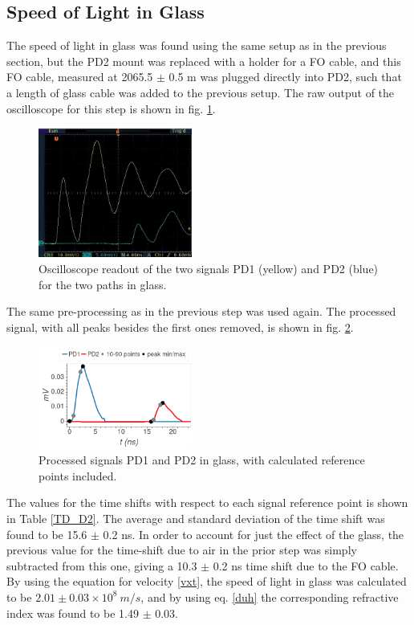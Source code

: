 \documentclass[aps,prl,reprint]{revtex4-2}
\begin{document}
\subsection{Speed of Light in Glass}

The speed of light in glass was found using the same setup as in the previous section,
but the PD2 mount was replaced with a holder for a FO cable, and this FO cable, measured
at 2065.5 $\pm$ 0.5 m was plugged directly into PD2, such that a length of glass cable
was added to the previous setup. The raw output of the oscilloscope for this step is shown in fig. 
\ref{glass_osc}. \\

\begin{figure}[h]
\includegraphics[width=0.45\textwidth]{./BMPs/l4_D_2_a.jpg}
\caption{\label{glass_osc} Oscilloscope readout of the two signals PD1 (yellow) and PD2
	(blue) for the two paths in glass. }
\end{figure}

The same pre-processing as in the previous step was used again.
The processed signal, with all peaks besides the
first ones removed, is shown in fig. \ref{glass_boke}. \\

\begin{figure}[h]
\includegraphics[width=0.45\textwidth]{../Images/l4_D_b.png}
\caption{\label{glass_boke} Processed signals PD1 and PD2 in glass, with calculated
	reference points included.}
\end{figure}

The values for the time shifts with respect to each signal reference point is shown in
Table \ref{TD_D2}. The average and standard deviation of the time shift was found 
to be 15.6 $\pm$ 0.2 ns. In order to account for just the effect of the glass, the previous
value for the time-shift due to air in the prior step was simply subtracted from this one,
giving a 10.3 $\pm$ 0.2 ns time shift due to the FO cable. 
By using the equation for velocity \ref{vxt}, the speed of light in glass was calculated
to be $2.01 \pm 0.03 \times 10^8\ m/s$, and
by using eq. \ref{duh} the corresponding refractive index was found to be 1.49 $\pm$ 0.03.\\
\end{document}
